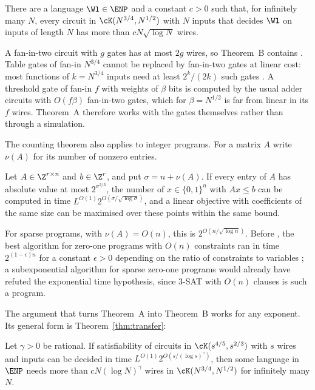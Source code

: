 \begin{theoremB}
There are a language $\Wl\in\ENP$ and a constant $c>0$ such that, for
infinitely many $N$, every circuit in $\cK(N^{3/4},N^{1/2})$ with $N$ inputs
that decides $\Wl$ on inputs of length $N$ has more than $cN\sqrt{\log N}$ wires.
\end{theoremB}

A fan-in-two circuit with $g$ gates has at most $2g$ wires, so Theorem~B
contains \cite[Corollary 1.4]{OAI26}. Table gates of fan-in $N^{3/4}$ cannot be
replaced by fan-in-two gates at linear cost: most functions of $k=N^{3/4}$
inputs need at least $2^k/(2k)$ such gates \cite{Sha49}. A threshold gate of
fan-in $f$ with weights of $\beta$ bits is computed by the usual adder circuits
with $O(f\beta)$ fan-in-two gates, which for $\beta=N^{1/2}$ is far from linear
in its $f$ wires. Theorem~A therefore works with the gates themselves rather
than through a simulation.

The counting theorem also applies to integer programs. For a matrix $A$ write
$\nu(A)$ for its number of nonzero entries.

\begin{theoremC}
Let $A\in\Z^{r\times n}$ and $b\in\Z^r$, and put $\sigma=n+\nu(A)$. If every
entry of $A$ has absolute value at most $2^{\sigma^{2/3}}$, the number of
$x\in\{0,1\}^n$ with $Ax\le b$ can be computed in time
$L^{O(1)}2^{O(\sigma/\sqrt{\log\sigma})}$, and a linear objective with
coefficients of the same size can be maximised over these points within the
same bound.
\end{theoremC}

For sparse programs, with $\nu(A)=O(n)$, this is $2^{O(n/\sqrt{\log n})}$.
Before \cite{OAI26}, the best algorithm for zero-one programs with $O(n)$
constraints ran in time $2^{(1-\epsilon)n}$ for a constant $\epsilon>0$
depending on the ratio of constraints to variables \cite{ILPS14}; a
subexponential algorithm for sparse zero-one programs would already have refuted
the exponential time hypothesis, since $3$-SAT with $O(n)$ clauses is such a
program.

The argument that turns Theorem~A into Theorem~B works for any exponent. Its
general form is Theorem~\ref{thm:transfer}:

\begin{theoremD}[Transfer]
Let $\gamma>0$ be rational. If satisfiability of circuits in $\cK(s^{4/5},s^{2/3})$ with
$s$ wires and inputs can be decided in time $L^{O(1)}2^{O(s/(\log s)^\gamma)}$,
then some language in $\ENP$ needs more than $cN(\log N)^\gamma$ wires in
$\cK(N^{3/4},N^{1/2})$ for infinitely many $N$.
\end{theoremD}


